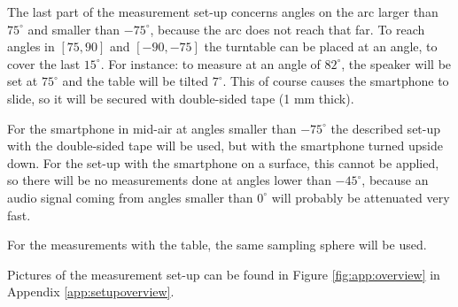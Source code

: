 The last part of the measurement set-up concerns angles on the arc larger than $75^\circ$ and smaller than $-75^\circ$, because the arc does not reach that far.
To reach angles in $[75,90]$ and $[-90,-75]$ the turntable can be placed at an angle, to cover the last $15^\circ$. For instance: to measure at an angle of $82^\circ$, the speaker will be set at $75^\circ$ and the table will be tilted $7^\circ$.
This of course causes the smartphone to slide, so it will be secured with double-sided tape (1 mm thick).

For the smartphone in mid-air at angles smaller than $-75^\circ$ the described set-up with the double-sided tape will be used, but with the smartphone turned upside down. For the set-up with the smartphone on a surface, this cannot be applied, so there will be no measurements done at angles lower than $-45^\circ$, because an audio signal coming from angles smaller than $0^\circ$ will probably be attenuated very fast.

For the measurements with the table, the same sampling sphere will be used.

Pictures of the measurement set-up can be found in Figure \ref{fig:app:overview} in Appendix \ref{app:setupoverview}.


